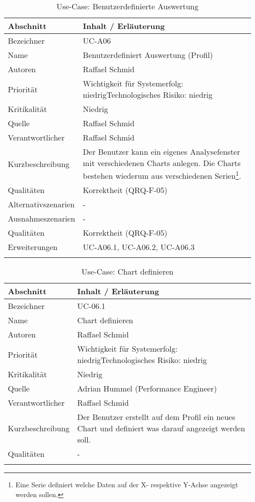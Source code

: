 \begin{longtable}{|p{4cm}|p{10.5cm}|}
\hline
   \textbf{Abschnitt} & \textbf{Inhalt / Erläuterung} \\\hline
   Bezeichner & UC-A06\\\hline
   Name & Benutzerdefiniert Auswertung (Profil)\\\hline
   Autoren & Raffael Schmid\\\hline
   Priorität & Wichtigkeit für Systemerfolg: niedrig\newline Technologisches Risiko: niedrig\\\hline
   Kritikalität & Niedrig\\\hline
   Quelle & Raffael Schmid\\\hline
   Verantwortlicher & Raffael Schmid\\\hline
   Kurzbeschreibung & Der Benutzer kann ein eigenes Analysefenster mit verschiedenen Charts anlegen. Die Charts bestehen wiederum aus verschiedenen Serien\footnote{Eine Serie definiert welche Daten auf der X- respektive Y-Achse angezeigt werden sollen.}.\\\hline
   Qualitäten & Korrektheit (QRQ-F-05)\\\hline
   Alternativszenarien & -\\\hline
   Ausnahmeszenarien & -\\\hline
   Qualitäten & Korrektheit (QRQ-F-05)\\\hline
   Erweiterungen & UC-A06.1, UC-A06.2, UC-A06.3\\\hline

\caption{Use-Case: Benutzerdefinierte Auswertung }
\end{longtable}

\begin{longtable}{|p{4cm}|p{10.5cm}|}
\hline
   \textbf{Abschnitt} & \textbf{Inhalt / Erläuterung} \\\hline
   Bezeichner & UC-06.1\\\hline
   Name & Chart definieren\\\hline
   Autoren & Raffael Schmid\\\hline
   Priorität & Wichtigkeit für Systemerfolg: niedrig\newline Technologisches Risiko: niedrig\\\hline
   Kritikalität & Niedrig\\\hline
   Quelle & Adrian Hummel (Performance Engineer)\\\hline
   Verantwortlicher & Raffael Schmid\\\hline
   Kurzbeschreibung & Der Benutzer erstellt auf dem Profil ein neues Chart und definiert was darauf angezeigt werden soll.\\\hline
   Qualitäten & -\\\hline
\caption{Use-Case: Chart definieren }
\end{longtable}

